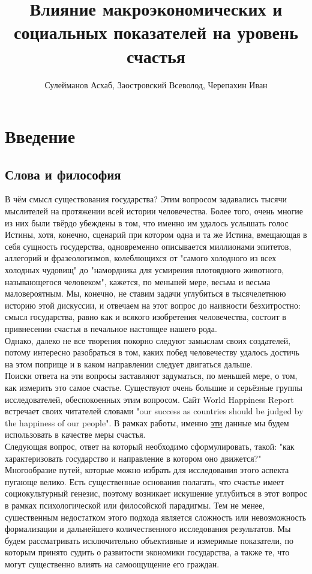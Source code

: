 \documentclass[russian]{vegareport}
\title{Влияние макроэкономических и социальных показателей на уровень счастья}
\author{Сулейманов Асхаб, Заостровский Всеволод, Черепахин Иван}
\date{}
\begin{document}
    \maketitle

    \chapter{Введение}
        \section{Слова и философия}
        В чём смысл существования государства? Этим вопросом задавались тысячи мыслителей на протяжении всей истории человечества. Более того, очень многие из них были твёрдо убеждены в том, что именно им удалось услышать голос Истины, хотя, конечно, сценарий при котором одна и та же Истина, вмещающая в себя сущность госудерства, одновременно описывается миллионами эпитетов, аллегорий и фразеологизмов, колеблющихся от "самого холодного из всех холодных чудовищ" до "намордника для усмирения плотоядного животного, называющегося человеком",  кажется, по меньшей мере, весьма и весьма маловероятным. Мы, конечно, не ставим задачи углубиться в тысячелетнюю историю этой дискуссии, и отвечаем на этот вопрос до наивности безхитростно: смысл государства, равно как и всякого изобретения человечества, состоит в привнесении счастья в печальное настоящее нашего рода. 
        \\
        Однако, далеко не все творения покорно следуют замыслам своих создателей, потому интересно разобраться в том, каких побед человечеству удалось достичь на этом поприще и в каком направлении следует двигаться дальше.
        \\
        Поиски ответа на эти вопросы заставляют задуматься, по меньшей мере, о том, как измерить это самое счастье. Существуют очень большие и серьёзные группы исследователей, обеспокоенных этим вопросом. Сайт World Happiness Report встречает своих читателей словами "our success as countries should be judged by the happiness of our people". В рамках работы, именно \href{https://worldhappiness.report/ed/2017/}{эти} данные мы будем использовать в качестве меры счастья.
        \\
        Следующая вопрос, ответ на который необходимо сформулировать, такой: "как характеризовать государство и направление в котором оно движется?" Многообразие путей, которые можно избрать для исследования этого аспекта пугающе велико. Есть существенные основания полагать, что счастье имеет социокультурный генезис, поэтому возникает искушение углубиться в этот вопрос в рамках психологической или филосойской парадигмы. Тем не менее, сушественным недостатком этого подхода является сложность или невозможность формализации и дальнейшего количественного исследования результатов. Мы будем рассматривать исключительно объективные и измеримые показатели, по которым принято судить о развитости экономики государства, а также те, что могут существенно влиять на самоощущение его граждан.
\end{document}
